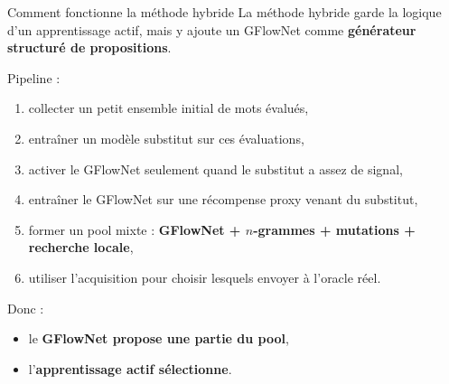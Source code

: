 \documentclass[aspectratio=169,10pt]{beamer}
\begin{document}
\begin{frame}{Comment fonctionne la méthode hybride}
\justifying
La méthode hybride garde la logique d'un apprentissage actif, mais y ajoute un
GFlowNet comme \textbf{générateur structuré de propositions}.

\vspace{0.5em}
Pipeline :
\begin{enumerate}
  \item collecter un petit ensemble initial de mots évalués,
  \item entraîner un modèle substitut sur ces évaluations,
  \item activer le GFlowNet seulement quand le substitut a assez de signal,
  \item entraîner le GFlowNet sur une récompense proxy venant du substitut,
  \item former un pool mixte : \textbf{GFlowNet + \(n\)-grammes + mutations +
  recherche locale},
  \item utiliser l'acquisition pour choisir lesquels envoyer à l'oracle réel.
\end{enumerate}

\vspace{0.5em}
Donc :
\begin{itemize}
  \item le \textbf{GFlowNet propose une partie du pool},
  \item l'\textbf{apprentissage actif sélectionne}.
\end{itemize}
\end{frame}
\end{document}
